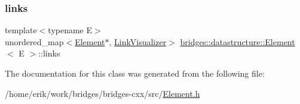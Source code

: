 \subsubsection{\texorpdfstring{links}{links}}
{\footnotesize\ttfamily template$<$typename E$>$ \\
unordered\+\_\+map$<$\hyperlink{classbridges_1_1datastructure_1_1_element}{Element}$\ast$, \hyperlink{classbridges_1_1datastructure_1_1_link_visualizer}{Link\+Visualizer}$>$ \hyperlink{classbridges_1_1datastructure_1_1_element}{bridges\+::datastructure\+::\+Element}$<$ E $>$\+::links\hspace{0.3cm}{\ttfamily [protected]}}



The documentation for this class was generated from the following file\+:\begin{DoxyCompactItemize}
\item 
/home/erik/work/bridges/bridges-\/cxx/src/\hyperlink{_element_8h}{Element.\+h}\end{DoxyCompactItemize}
